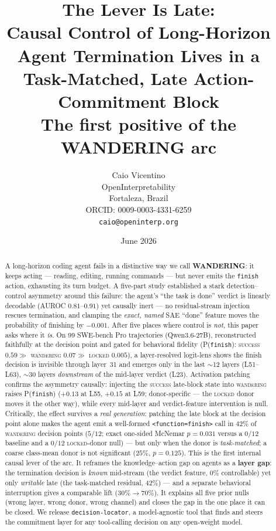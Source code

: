 \documentclass[11pt]{article}
\title{The Lever Is Late: \\
Causal Control of Long-Horizon Agent Termination Lives in a \\
Task-Matched, Late Action-Commitment Block \\[2pt]
\large The first positive of the WANDERING arc}
\author{%
  Caio Vicentino \\
  OpenInterpretability \\
  Fortaleza, Brazil \\
  ORCID: 0009-0003-4331-6259 \\
  \texttt{caio@openinterp.org}%
}
\date{June 2026}
\begin{document}
\maketitle

\begin{abstract}
A long-horizon coding agent fails in a distinctive way we call \textbf{WANDERING}: it keeps acting --- reading, editing, running commands --- but never emits the \texttt{finish} action, exhausting its turn budget. A five-part study established a stark detection--control asymmetry around this failure: the agent's ``the task is done'' verdict is linearly decodable (AUROC $0.81$--$0.91$) yet causally inert --- no residual-stream injection rescues termination, and clamping the \emph{exact, named} SAE ``done'' feature moves the probability of finishing by $-0.001$. After five places where control is \emph{not}, this paper asks where it \emph{is}. On 99 SWE-bench Pro trajectories (Qwen3.6-27B), reconstructed faithfully at the decision point and gated for behavioral fidelity (P(\texttt{finish}): \textsc{success} $0.59 \gg$ \textsc{wandering} $0.07 \gg$ \textsc{locked} $0.005$), a layer-resolved logit-lens shows the finish decision is invisible through layer~31 and emerges only in the last $\sim$12 layers (L51--L63), $\sim$30 layers \emph{downstream} of the mid-layer verdict (L23). Activation patching confirms the asymmetry causally: injecting the \textsc{success} late-block state into \textsc{wandering} raises P(\texttt{finish}) ($+0.13$ at L55, $+0.15$ at L59; donor-specific --- the \textsc{locked} donor moves it the other way), while every mid-layer and verdict-feature intervention is null. Critically, the effect survives a \emph{real generation}: patching the late block at the decision point alone makes the agent emit a well-formed \texttt{<function=finish>} call in $42\%$ of \textsc{wandering} decision points ($5/12$; exact one-sided McNemar $p=0.031$ versus a $0/12$ baseline and a $0/12$ \textsc{locked}-donor null) --- but only when the donor is \emph{task-matched}; a coarse class-mean donor is not significant ($25\%$, $p=0.125$). This is the first internal causal lever of the arc. It reframes the knowledge--action gap on agents as a \textbf{layer gap}: the termination decision is \emph{known} mid-stream (the verdict feature, $0\%$ controllable) yet only \emph{writable} late (the task-matched residual, $42\%$) --- and a separate behavioral interruption gives a comparable lift ($30\%\to70\%$). It explains all five prior nulls (wrong layer, wrong donor, wrong channel) and closes the gap in the one place it can be closed. We release \texttt{decision-locator}, a model-agnostic tool that finds and steers the commitment layer for any tool-calling decision on any open-weight model.
\end{abstract}
\end{document}
